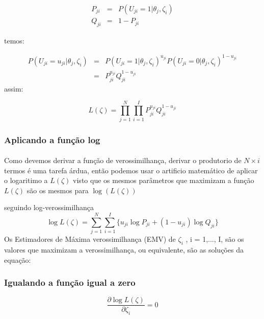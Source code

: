 	\begin{eqnarray}
		P_{ji} &=& P(U_{ji} = 1|\theta_j,\zeta_i)\\
		Q_{ji} &=& 1 - P_{ji}
	\end{eqnarray}
	
	temos:
	
	\begin{eqnarray}
		P(U_{ji} = u_{ji}|\theta_j,\zeta_i) &=& P(U_{ji} = 1|\theta_j,\zeta_i)^{u_{ji}}P(U_{ji} = 0|\theta_j,\zeta_i)^{1 - u_{ji}}\\
		& = & P_{ji}^{u_{ji}}Q_{ji}^{1 - u_{ji}}
	\end{eqnarray}
	assim:
	
	$$
	L(\zeta) = \displaystyle\prod_{j = 1}^N\displaystyle\prod_{i = 1}^{I}P_{ji}^{u_{ji}}Q_{ji}^{1 - u_{ji}}
	$$
	
	\subsubsection{Aplicando a função log}
	\paragraph{}
	    Como devemos derivar a função de verossimilhança, derivar o produtorio de $N \times i$ termos é uma tarefa árdua, então podemos usar o artificio matemático de aplicar o logaritimo a $L(\zeta)$ visto que os mesmos parâmetros que maximizam a função $L(\zeta)$ são os mesmos para $\log(L(\zeta))$
	
	seguindo log-verossimilhança\\
	$$
	\log L(\zeta) = \displaystyle\sum_{j = 1}^{N}\displaystyle\sum_{i = 1}^{I}\{u_{ji}\log P_{ji} + (1 - u_{ji})\log Q_{ji}\}
	$$
	Os Estimadores de Máxima verossimilhança (EMV) de $\zeta_i$ , i = 1,..., I, são os valores que maximizam a verossimilhança, ou equivalente, são as soluções da equação:
	\subsubsection{Igualando a função igual a zero}
	$$
	\displaystyle\frac{\partial\log L(\zeta)}{\partial\zeta_i} = 0
	$$
	
